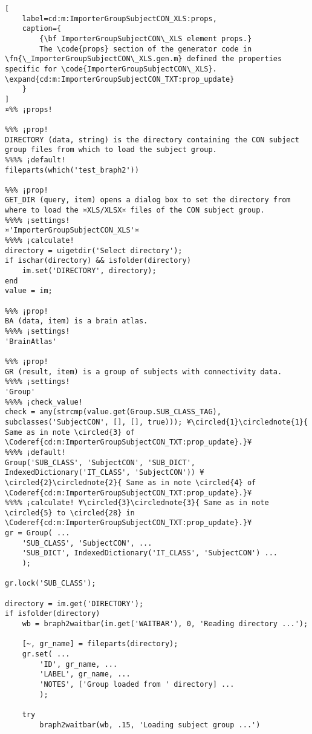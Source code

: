 \documentclass{tufte-handout}
\begin{document}
\begin{lstlisting}[
	label=cd:m:ImporterGroupSubjectCON_XLS:props,
	caption={
		{\bf ImporterGroupSubjectCON\_XLS element props.}
		The \code{props} section of the generator code in \fn{\_ImporterGroupSubjectCON\_XLS.gen.m} defined the properties specific for \code{ImporterGroupSubjectCON\_XLS}. \expand{cd:m:ImporterGroupSubjectCON_TXT:prop_update}
	}
]
¤%% ¡props!

%%% ¡prop!
DIRECTORY (data, string) is the directory containing the CON subject group files from which to load the subject group.
%%%% ¡default!
fileparts(which('test_braph2'))

%%% ¡prop!
GET_DIR (query, item) opens a dialog box to set the directory from where to load the ¤XLS/XLSX¤ files of the CON subject group.
%%%% ¡settings!
¤'ImporterGroupSubjectCON_XLS'¤
%%%% ¡calculate!
directory = uigetdir('Select directory');
if ischar(directory) && isfolder(directory)
    im.set('DIRECTORY', directory);
end
value = im;

%%% ¡prop!
BA (data, item) is a brain atlas.
%%%% ¡settings!
'BrainAtlas'

%%% ¡prop!
GR (result, item) is a group of subjects with connectivity data.
%%%% ¡settings!
'Group'
%%%% ¡check_value!
check = any(strcmp(value.get(Group.SUB_CLASS_TAG), subclasses('SubjectCON', [], [], true))); ¥\circled{1}\circlednote{1}{ Same as in note \circled{3} of \Coderef{cd:m:ImporterGroupSubjectCON_TXT:prop_update}.}¥
%%%% ¡default!
Group('SUB_CLASS', 'SubjectCON', 'SUB_DICT', IndexedDictionary('IT_CLASS', 'SubjectCON')) ¥\circled{2}\circlednote{2}{ Same as in note \circled{4} of \Coderef{cd:m:ImporterGroupSubjectCON_TXT:prop_update}.}¥
%%%% ¡calculate! ¥\circled{3}\circlednote{3}{ Same as in note \circled{5} to \circled{28} in \Coderef{cd:m:ImporterGroupSubjectCON_TXT:prop_update}.}¥
gr = Group( ...
    'SUB_CLASS', 'SubjectCON', ...
    'SUB_DICT', IndexedDictionary('IT_CLASS', 'SubjectCON') ...
    );

gr.lock('SUB_CLASS');

directory = im.get('DIRECTORY');
if isfolder(directory)
    wb = braph2waitbar(im.get('WAITBAR'), 0, 'Reading directory ...');
    
    [~, gr_name] = fileparts(directory);
    gr.set( ...
        'ID', gr_name, ...
        'LABEL', gr_name, ...
        'NOTES', ['Group loaded from ' directory] ...
        );

    try
        braph2waitbar(wb, .15, 'Loading subject group ...')
        

\end{lstlisting}
\end{document}
